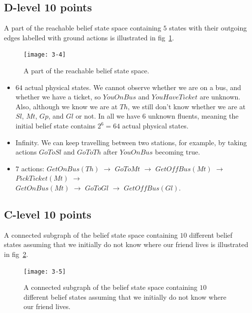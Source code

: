 \documentclass[11pt,a4paper]{article}
\begin{document}
\subsection{D-level 10 points}
\par A part of the reachable belief state space containing $5$ states with their outgoing edges labelled with ground actions is illustrated in fig~\ref{fig:3-4}.
\begin{figure}[!htbp]
	\footnotesize
	\centering
	\texttt{[image: 3-4]}
	\caption{A part of the reachable belief state space.}
	\label{fig:3-4}
\end{figure}

\begin{itemize}
	\item $64$ actual physical states. We cannot observe whether we are on a bus, and whether we have a ticket, so $YouOnBus$ and $YouHaveTicket$ are unknown. Also, although we know we are at $Th$, we still don't know whether we are at $Sl$, $Mt$, $Gp$, and $Gl$ or not. In all we have $6$ unknown fluents, meaning the initial belief state contains $2^{6} = 64$ actual physical states.
	\item Infinity. We can keep travelling between two stations, for example, by taking actions $GoToSl$ and $GoToTh$ after $YouOnBus$ becoming true.
	\item $7$ actions: $GetOnBus(Th)$ $\rightarrow$ $GoToMt$ $\rightarrow$ $GetOffBus(Mt)$ $\rightarrow$ $PickTicket(Mt)$ $\rightarrow$ \\ $GetOnBus(Mt)$ $\rightarrow$ $GoToGl$ $\rightarrow$ $GetOffBus(Gl)$.
\end{itemize}

\subsection{C-level 10 points}
\par A connected subgraph of the belief state space containing $10$ different belief states assuming that we initially do not know where our friend lives is illustrated in fig~\ref{fig:3-5}.
\begin{figure}[!htbp]
	\footnotesize
	\centering
	\texttt{[image: 3-5]}
	\caption{A connected subgraph of the belief state space containing $10$ different belief states assuming that we initially do not know where our friend lives.}
	\label{fig:3-5}
\end{figure}
\end{document}
